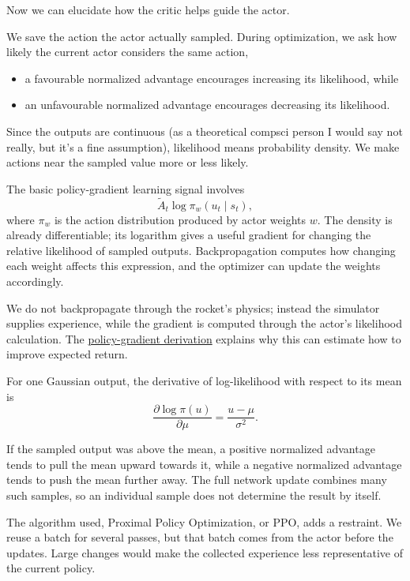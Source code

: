 \documentclass[12pt, letterpaper]{article}
\begin{document}
Now we can elucidate how the critic 
helps guide the actor. 

We save the action the actor actually sampled.  
During optimization, we ask how likely 
the current actor considers the same action, 
\begin{itemize}
    \item a favourable normalized advantage encourages increasing its likelihood, while 
    \item an unfavourable normalized advantage encourages decreasing its likelihood.
\end{itemize}

Since the outputs are continuous (as a theoretical compsci person 
I would say not really, but it's a fine assumption), 
likelihood means probability density. 
We make actions near the sampled 
value more or less likely. 

The basic policy-gradient learning signal involves 
\[
    \widetilde A_t \log \pi_w(u_t \mid s_t), 
\]
where $\pi_w$ is the action distribution produced 
by actor weights $w$. 
The density is already differentiable; its logarithm gives a useful
gradient for changing the relative likelihood of sampled outputs.
Backpropagation computes how changing each weight 
affects this expression, and the optimizer 
can update the weights accordingly. 

We do not backpropagate through the rocket's 
physics; instead the simulator 
supplies experience, while 
the gradient is computed through the actor's 
likelihood calculation. 
The \href{https://spinningup.openai.com/en/latest/spinningup/rl_intro3.html}{policy-gradient derivation}
explains why this can estimate how to improve 
expected return. 

For one Gaussian output, the derivative of log-likelihood 
with respect to its mean is 
\[
    \frac{\partial \log \pi(u)}{\partial \mu} = 
    \frac{u-\mu}{\sigma^2}. 
\]

If the sampled output was above the mean, 
a positive normalized advantage tends to pull 
the mean upward towards it, while 
a negative normalized advantage tends to push the mean further 
away. The full network update combines many 
such samples, so an individual sample does not 
determine the result by itself. 

The algorithm used, Proximal Policy Optimization, 
or PPO, adds a restraint. We reuse a batch 
for several passes, but that batch 
comes from the actor before the updates. 
Large changes would make the collected 
experience less representative of the current policy. 
\end{document}
